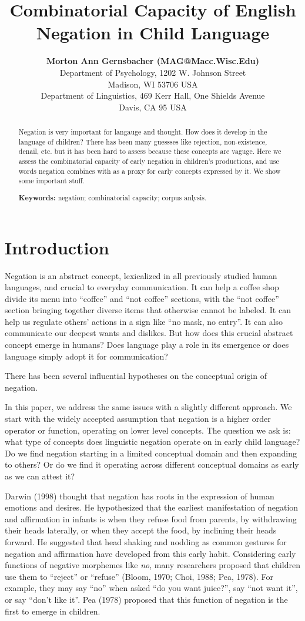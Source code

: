 \documentclass[10pt, letterpaper]{article}
\title{Combinatorial Capacity of English Negation in Child Language}
\author{{\large \bf Morton Ann Gernsbacher (MAG@Macc.Wisc.Edu)} \\ Department of Psychology, 1202 W. Johnson Street \\ Madison, WI 53706 USA \AND {\large \bf Masoud Jasbi (jasbi@ucdavis.edu)} \\ Department of Linguistics, 469 Kerr Hall, One Shields Avenue \\ Davis, CA 95 USA}
\begin{document}
\maketitle

\begin{abstract}
Negation is very important for langauge and thought. How does it develop
in the language of children? There has been many guessses like
rejection, non-existence, denail, etc. but it has been hard to assess
because these concepts are vaguge. Here we assess the combinatorial
capacity of early negation in children's productions, and use words
negation combines with as a proxy for early concepts expressed by it. We
show some important stuff.

\textbf{Keywords:}
negation; combinatorial capacity; corpus anlysis.
\end{abstract}

\hypertarget{introduction}{%
\section{Introduction}\label{introduction}}

Negation is an abstract concept, lexicalized in all previously studied
human languages, and crucial to everyday communication. It can help a
coffee shop divide its menu into ``coffee'' and ``not coffee'' sections,
with the ``not coffee'' section bringing together diverse items that
otherwise cannot be labeled. It can help us regulate others' actions in
a sign like ``no mask, no entry''. It can also communicate our deepest
wants and dislikes. But how does this crucial abstract concept emerge in
humans? Does language play a role in its emergence or does language
simply adopt it for communication?

There has been several influential hypotheses on the conceptual origin
of negation.

In this paper, we address the same issues with a slightly different
approach. We start with the widely accepted assumption that negation is
a higher order operator or function, operating on lower level concepts.
The question we ask is: what type of concepts does linguistic negation
operate on in early child language? Do we find negation starting in a
limited conceptual domain and then expanding to others? Or do we find it
operating across different conceptual domains as early as we can attest
it?

Darwin (1998) thought that negation has roots in the expression of human
emotions and desires. He hypothesized that the earliest manifestation of
negation and affirmation in infants is when they refuse food from
parents, by withdrawing their heads laterally, or when they accept the
food, by inclining their heads forward. He suggested that head shaking
and nodding as common gestures for negation and affirmation have
developed from this early habit. Considering early functions of negative
morphemes like \emph{no}, many researchers proposed that children use
them to ``reject'' or ``refuse'' (Bloom, 1970; Choi, 1988; Pea, 1978).
For example, they may say ``no'' when asked ``do you want juice?'', say
``not want it'', or say ``don't like it''. Pea (1978) proposed that this
function of negation is the first to emerge in children.
\end{document}
